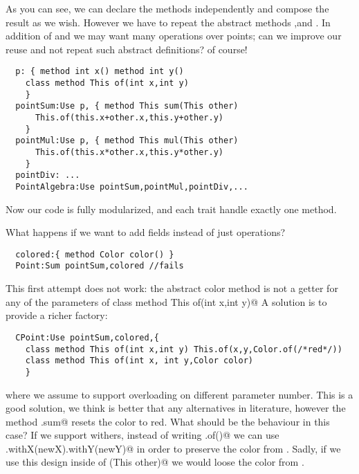   As you can see, we can declare the methods independently and compose the result
  as we wish. However we have to repeat the abstract methods \Q@x@,\Q@y@ and \Q@of@.
  In addition of \Q@Sum@ and \Q@Mul@ we may want many operations over points; can we improve our reuse
  and not repeat such abstract definitions? of course!

\begin{lstlisting}
  p: { method int x() method int y()
    class method This of(int x,int y)
    }
  pointSum:Use p, { method This sum(This other)
      This.of(this.x+other.x,this.y+other.y)
    }
  pointMul:Use p, { method This mul(This other)
      This.of(this.x*other.x,this.y*other.y)
    }
  pointDiv: ...
  PointAlgebra:Use pointSum,pointMul,pointDiv,...
\end{lstlisting}
      
Now our code is fully modularized, and each trait handle exactly one method.

What happens if we want to add fields instead of just operations?

\begin{lstlisting}
  colored:{ method Color color() }
  Point:Sum pointSum,colored //fails
\end{lstlisting}

This first attempt does not work: the abstract color method
is not a getter for any of the parameters of 
\Q@ class method This of(int x,int y)@
A solution is to provide a richer factory:

\begin{lstlisting}
  CPoint:Use pointSum,colored,{
    class method This of(int x,int y) This.of(x,y,Color.of(/*red*/))
    class method This of(int x, int y,Color color)
    }
\end{lstlisting}

where we assume to support overloading on different parameter number.
This is a good solution, we think is better that any alternatives in literature,
however the method \Q@CPoint.sum@ resets the color to red.
What should be the behaviour in this case?
If we support withers, instead of writing \Q@This.of()@ we can use
\Q@this.withX(newX).withY(newY)@ in order to preserve the color from \Q@this@.
Sadly, if we use this design inside of \Q@sum(This other)@ we would loose the color from \Q@other@.

